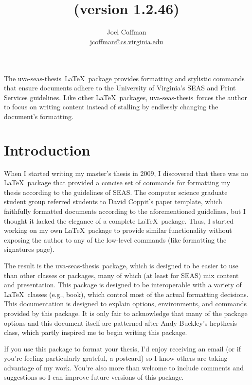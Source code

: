 \documentclass[10pt]{article}
\title{\thispackage\\{\normalsize (version 1.2.46)}}
\author{
  Joel Coffman\\
  \url{jcoffman@cs.virginia.edu}
}
\newcommand{\class}[1]{#1}
\newcommand{\package}[1]{#1}
\newcommand{\thispackage}{\package{uva-seas-thesis}}
\begin{document}
\maketitle

The \thispackage\ \LaTeX\ package provides formatting and stylistic commands that ensure documents adhere to the University of Virginia's \gls{SEAS} and Print Services guidelines.
Like other \LaTeX\ packages, \thispackage\ forces the author to focus on writing content instead of stalling by endlessly changing the document's formatting.

\section{Introduction}\label{section:introduction}
When I started writing my master's thesis in 2009, I discovered that there was no \LaTeX\ package that provided a concise set of commands for formatting my thesis according to the guidelines of \gls{SEAS}.
The computer science graduate student group referred students to David Coppit's paper template, which faithfully formatted documents according to the aforementioned guidelines, but I thought it lacked the elegance of a complete \LaTeX\ package.
Thus, I started working on my own \LaTeX\ package to provide similar functionality without exposing the author to any of the low-level commands (like formatting the signatures page).

The result is the \thispackage\ package, which is designed to be easier to use than other classes or packages, many of which (at least for \gls{SEAS}) mix content and presentation.
This package is designed to be interoperable with a variety of \LaTeX\ classes (e.g., \class{book}), which control most of the actual formatting decisions.
This documentation is designed to explain options, environments, and commands provided by this package.
It is only fair to acknowledge that many of the package options and this document itself are patterned after Andy Buckley's \class{hepthesis} class, which partly inspired me to begin writing this package.

If you use this package to format your thesis, I'd enjoy receiving an email (or if you're feeling particularly grateful, a postcard) so I know others are taking advantage of my work.
You're also more than welcome to include comments and suggestions so I can improve future versions of this package.

\end{document}
